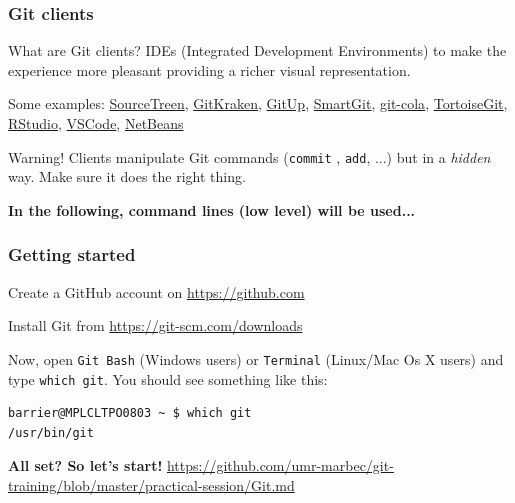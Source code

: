 \documentclass[svgnames]{beamer}
\begin{document}
\begin{frame}[fragile]
    \frametitle{Git clients}

	\begin{block}{What are Git clients?}
    IDEs (Integrated Development Environments) to make the experience more pleasant providing a richer visual representation.\\
    \end{block}
    \hfill

Some examples:
\href{https://www.sourcetreeapp.com/}{SourceTreen}, 
\href{https://www.gitkraken.com/}{GitKraken},
\href{https://gitup.co/}{GitUp},
\href{https://www.syntevo.com/smartgit/}{SmartGit}, 
\href{https://git-cola.github.io/}{git-cola}, 
\href{https://tortoisegit.org/}{TortoiseGit},
\href{https://www.rstudio.com/}{RStudio},
\href{https://code.visualstudio.com/}{VSCode},
\href{https://netbeans.apache.org/}{NetBeans}\\

\hfill

\begin{alertblock}{Warning!}
Clients manipulate Git commands (\verb+commit+ , \verb+add+, ...) but in a \emph{hidden} way. 
Make sure it does the right thing.
\end{alertblock}
\hfill

\textbf{In the following, command lines (low level) will be used...}

\end{frame}

\begin{frame}[fragile]
\frametitle{Getting started}

Create a GitHub account on \url{https://github.com}\\
\hfill

Install Git from \url{https://git-scm.com/downloads}\\
\hfill




Now, open \verb+Git Bash+ (Windows users) or \verb+Terminal+ (Linux/Mac Os X users) and type \verb+which git+. You should see something like this:

\begin{verbatim}
barrier@MPLCLTPO0803 ~ $ which git
/usr/bin/git
\end{verbatim}

\textbf{All set? So let's start!}
\url{https://github.com/umr-marbec/git-training/blob/master/practical-session/Git.md}

\end{frame}
\end{document}
